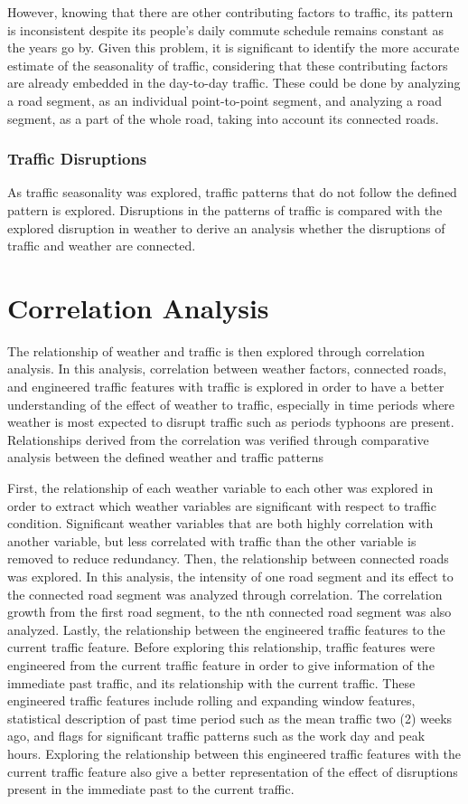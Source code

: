 However, knowing that there are other contributing factors to traffic, its pattern is inconsistent despite its people’s daily commute schedule remains constant as the years go by. Given this problem, it is significant to identify the more accurate estimate of the seasonality of traffic, considering that these contributing factors are already embedded in the day-to-day traffic. These could be done by analyzing a road segment, as an individual point-to-point segment, and analyzing a road segment, as a part of the whole road, taking into account its connected roads. 

\subsubsection{Traffic Disruptions}
As traffic seasonality was explored, traffic patterns that do not follow the defined pattern is explored. Disruptions in the patterns of traffic is compared with the explored disruption in weather to derive an analysis whether the disruptions of traffic and weather are connected. 

\section{Correlation Analysis}
The relationship of weather and traffic is then explored through correlation analysis. In this analysis, correlation between weather factors, connected roads, and engineered traffic features with traffic is explored in order to have a better understanding of the effect of weather to traffic, especially in time periods where weather is most expected to disrupt traffic such as periods typhoons are present. Relationships derived from the correlation was verified through comparative analysis between the defined weather and traffic patterns

First, the relationship of each weather variable to each other was explored in order to extract which weather variables are significant with respect to traffic condition. Significant weather variables that are both highly correlation with another variable, but less correlated with traffic than the other variable is removed to reduce redundancy. Then, the relationship between connected roads was explored. In this analysis, the intensity of one road segment and its effect to the connected road segment was analyzed through correlation. The correlation growth from the first road segment, to the nth connected road segment was also analyzed.  Lastly, the relationship between the engineered traffic features to the current traffic feature. Before exploring this relationship, traffic features were engineered from the current traffic feature in order to give information of the immediate past traffic, and its relationship with the current traffic. These engineered traffic features include rolling and expanding window features, statistical description of past time period such as the mean traffic two (2) weeks ago, and flags for significant traffic patterns such as the work day and peak hours. Exploring the relationship between this engineered traffic features with the current traffic feature also give a better representation of the effect of disruptions present in the immediate past to the current traffic. 

